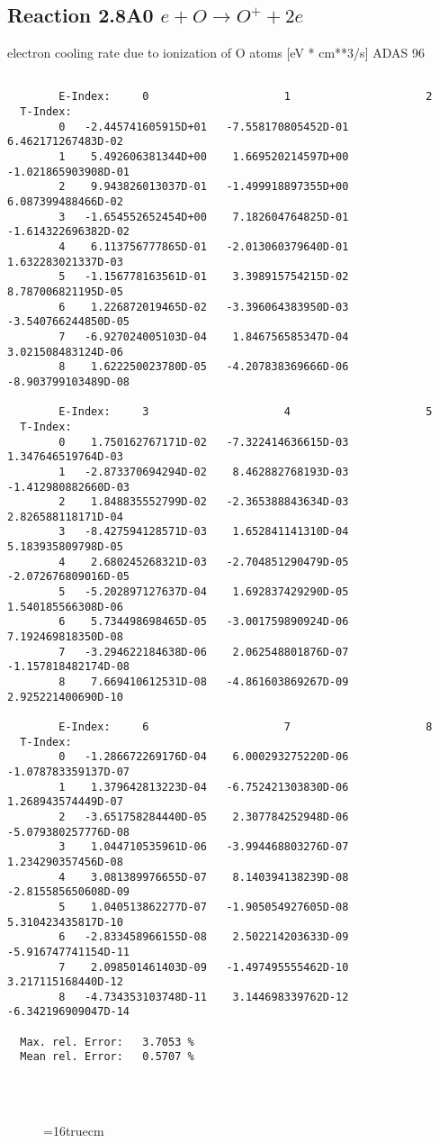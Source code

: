 \documentclass[12pt,dvipdfmx]{article}
\begin{document}
\subsection{
  Reaction 2.8A0  $e + O  \rightarrow O^+   + 2e $
}
electron cooling rate due to ionization of O atoms [eV * cm**3/s]
ADAS 96

\begin{small}\begin{verbatim}

        E-Index:     0                     1                     2
  T-Index:
        0   -2.445741605915D+01   -7.558170805452D-01    6.462171267483D-02
        1    5.492606381344D+00    1.669520214597D+00   -1.021865903908D-01
        2    9.943826013037D-01   -1.499918897355D+00    6.087399488466D-02
        3   -1.654552652454D+00    7.182604764825D-01   -1.614322696382D-02
        4    6.113756777865D-01   -2.013060379640D-01    1.632283021337D-03
        5   -1.156778163561D-01    3.398915754215D-02    8.787006821195D-05
        6    1.226872019465D-02   -3.396064383950D-03   -3.540766244850D-05
        7   -6.927024005103D-04    1.846756585347D-04    3.021508483124D-06
        8    1.622250023780D-05   -4.207838369666D-06   -8.903799103489D-08

        E-Index:     3                     4                     5
  T-Index:
        0    1.750162767171D-02   -7.322414636615D-03    1.347646519764D-03
        1   -2.873370694294D-02    8.462882768193D-03   -1.412980882660D-03
        2    1.848835552799D-02   -2.365388843634D-03    2.826588118171D-04
        3   -8.427594128571D-03    1.652841141310D-04    5.183935809798D-05
        4    2.680245268321D-03   -2.704851290479D-05   -2.072676809016D-05
        5   -5.202897127637D-04    1.692837429290D-05    1.540185566308D-06
        6    5.734498698465D-05   -3.001759890924D-06    7.192469818350D-08
        7   -3.294622184638D-06    2.062548801876D-07   -1.157818482174D-08
        8    7.669410612531D-08   -4.861603869267D-09    2.925221400690D-10

        E-Index:     6                     7                     8
  T-Index:
        0   -1.286672269176D-04    6.000293275220D-06   -1.078783359137D-07
        1    1.379642813223D-04   -6.752421303830D-06    1.268943574449D-07
        2   -3.651758284440D-05    2.307784252948D-06   -5.079380257776D-08
        3    1.044710535961D-06   -3.994468803276D-07    1.234290357456D-08
        4    3.081389976655D-07    8.140394138239D-08   -2.815585650608D-09
        5    1.040513862277D-07   -1.905054927605D-08    5.310423435817D-10
        6   -2.833458966155D-08    2.502214203633D-09   -5.916747741154D-11
        7    2.098501461403D-09   -1.497495555462D-10    3.217115168440D-12
        8   -4.734353103748D-11    3.144698339762D-12   -6.342196909047D-14

  Max. rel. Error:   3.7053 %
  Mean rel. Error:   0.5707 %




\end{verbatim}\end{small}
\begin{figure} \label{2.8il}
\epsfxsize=16truecm 
\end{figure}
\newpage
\end{document}
